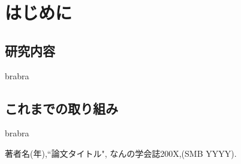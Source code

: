 \documentclass[a4j,10pt, twocolumn]{jarticle}
\begin{document}
\section{はじめに}
\subsection{研究内容}
brabra
\subsection{これまでの取り組み}
brabra
\begin{thebibliography}{3}
 \label{takada}
著者名(年),``論文タイトル", なんの学会誌200X,(SMB YYYY).
\end{thebibliography}
\end{document}
